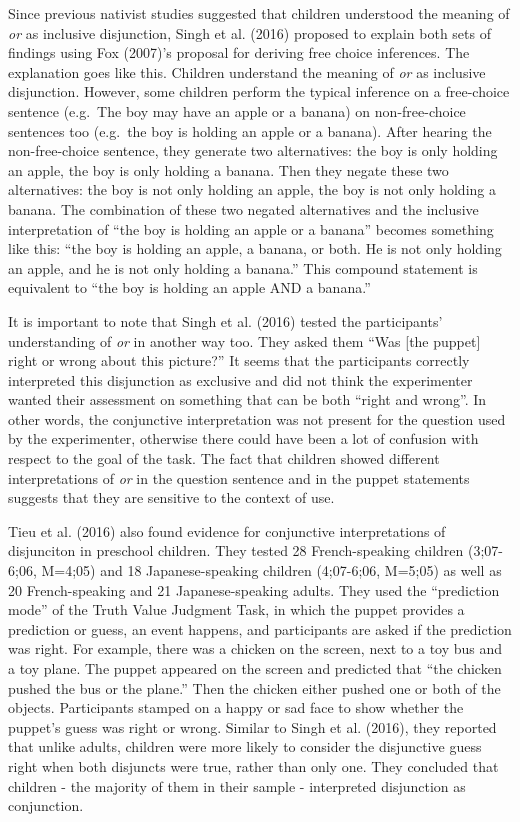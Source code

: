 \documentclass[oneside]{report}
\theoremstyle{definition}
\theoremstyle{definition}
\theoremstyle{definition}
\theoremstyle{remark}
\begin{document}
Since previous nativist studies suggested that children understood the
meaning of \emph{or} as inclusive disjunction, Singh et al. (2016)
proposed to explain both sets of findings using Fox (2007)'s proposal
for deriving free choice inferences. The explanation goes like this.
Children understand the meaning of \emph{or} as inclusive disjunction.
However, some children perform the typical inference on a free-choice
sentence (e.g.~The boy may have an apple or a banana) on non-free-choice
sentences too (e.g.~the boy is holding an apple or a banana). After
hearing the non-free-choice sentence, they generate two alternatives:
the boy is only holding an apple, the boy is only holding a banana. Then
they negate these two alternatives: the boy is not only holding an
apple, the boy is not only holding a banana. The combination of these
two negated alternatives and the inclusive interpretation of ``the boy
is holding an apple or a banana'' becomes something like this: ``the boy
is holding an apple, a banana, or both. He is not only holding an apple,
and he is not only holding a banana.'' This compound statement is
equivalent to ``the boy is holding an apple AND a banana.''

It is important to note that Singh et al. (2016) tested the
participants' understanding of \emph{or} in another way too. They asked
them ``Was {[}the puppet{]} right or wrong about this picture?'' It
seems that the participants correctly interpreted this disjunction as
exclusive and did not think the experimenter wanted their assessment on
something that can be both ``right and wrong''. In other words, the
conjunctive interpretation was not present for the question used by the
experimenter, otherwise there could have been a lot of confusion with
respect to the goal of the task. The fact that children showed different
interpretations of \emph{or} in the question sentence and in the puppet
statements suggests that they are sensitive to the context of use.

Tieu et al. (2016) also found evidence for conjunctive interpretations
of disjunciton in preschool children. They tested 28 French-speaking
children (3;07-6;06, M=4;05) and 18 Japanese-speaking children
(4;07-6;06, M=5;05) as well as 20 French-speaking and 21
Japanese-speaking adults. They used the ``prediction mode'' of the Truth
Value Judgment Task, in which the puppet provides a prediction or guess,
an event happens, and participants are asked if the prediction was
right. For example, there was a chicken on the screen, next to a toy bus
and a toy plane. The puppet appeared on the screen and predicted that
``the chicken pushed the bus or the plane.'' Then the chicken either
pushed one or both of the objects. Participants stamped on a happy or
sad face to show whether the puppet's guess was right or wrong. Similar
to Singh et al. (2016), they reported that unlike adults, children were
more likely to consider the disjunctive guess right when both disjuncts
were true, rather than only one. They concluded that children - the
majority of them in their sample - interpreted disjunction as
conjunction.
\end{document}
